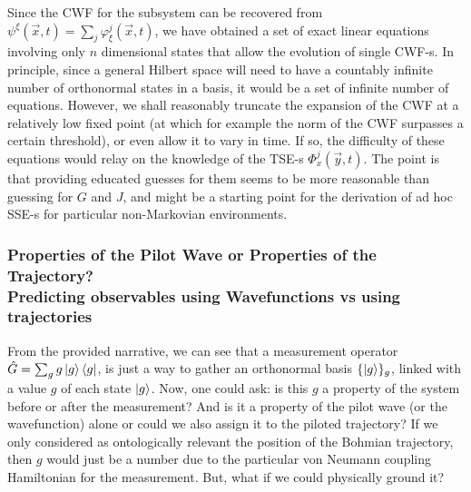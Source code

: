 \documentclass[11pt, a4paper]{article} %
\begin{document}
Since the CWF for the subsystem can be recovered from $\psi^\xi(\vec{x},t)=\sum_j \varphi^j_\xi(\vec{x},t)$, we have obtained a set of exact linear equations involving only $n$ dimensional states that allow the evolution of single CWF-s. In principle, since a general Hilbert space will need to have a countably infinite number of orthonormal states in a basis, it would be a set of infinite number of equations. However, we shall reasonably truncate the expansion of the CWF at a relatively low fixed point (at which for example the norm of the CWF surpasses a certain threshold), or even allow it to vary in time. If so, the difficulty of these equations would relay on the knowledge of the TSE-s $\Phi^j_x(\vec{y},t)$. The point is that providing educated guesses for them seems to be more reasonable than guessing for $G$ and $J$, and might be a starting point for the derivation of ad hoc SSE-s for particular non-Markovian environments.  

 
\subsubsection*{Properties of the Pilot Wave or Properties of the Trajectory? \\ Predicting observables using Wavefunctions vs using trajectories}

From the provided narrative, we can see that a measurement operator $\hat{G}=\sum_g g\ket{g}\bra{g}$, is just a way to gather an orthonormal basis $\{\ket{g}\}_g$, linked with a value $g$ of each state $\ket{g}$. Now, one could ask: is this $g$ a property of the system before or after the measurement? And is it a property of the pilot wave (or the wavefunction) alone or could we also assign it to the piloted trajectory? If we only considered as ontologically relevant the position of the Bohmian trajectory, then $g$ would just be a number due to the particular von Neumann coupling Hamiltonian for the measurement. But, what if we could physically ground it?
\end{document}
